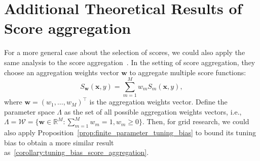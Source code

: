 \documentclass{article}
\newcommand{\1}{\mathbbm{1}}
\theoremstyle{plain}
\theoremstyle{definition}
\theoremstyle{remark}
\begin{document}
\section{Additional Theoretical Results of Score aggregation}
\label{sec:additional_theoretical_results}
For a more general case about the selection of scores, we could also apply the same analysis to the score aggregation~\citep{luo2024weighted}. 
In the setting of score aggregation, they choose an aggregation weights vector \(\boldsymbol{w}\) to aggregate multiple score functions:
\begin{equation*}
    S_{\boldsymbol{w}}(\boldsymbol{x}, y) = \sum_{m=1}^M w_m S_m(\boldsymbol{x}, y),
\end{equation*}
where \(\boldsymbol{w} = (w_1, \ldots, w_M)^\top\) is the aggregation weights vector. 
Define the parameter space $\Lambda$ as the set of all possible aggregation weights vectors, i.e., $\Lambda = \mathcal{W} = \{ \boldsymbol{w} \in \mathbb{R}^M: \sum_{m=1}^M w_m = 1, w_m \geq 0 \}$. 
Then, for grid research, we could also apply Proposition~\ref{prop:finite_parameter_tuning_bias} to bound its tuning bias to obtain a more similar result as~\cref{corollary:tuning_bias_score_aggregation}.
\end{document}
